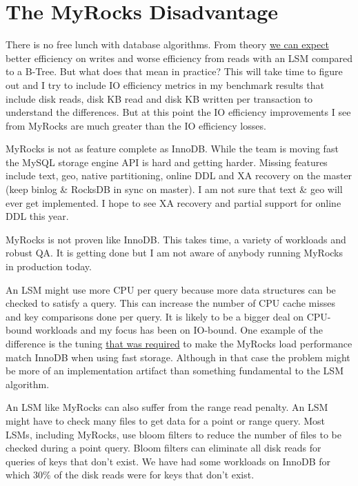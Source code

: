 \documentclass[a4paper,12pt,notitlepage,twoside,openright]{article}
\begin{document}
\hypertarget{the-myrocks-disadvantage}{%
\section{The MyRocks Disadvantage}\label{the-myrocks-disadvantage}}

There is no free lunch with database algorithms. From theory
\href{http://smalldatum.blogspot.com/2015/11/read-write-space-amplification-b-tree.html}{we
can expect} better efficiency on writes and worse efficiency from reads
with an LSM compared to a B-Tree. But what does that mean in practice?
This will take time to figure out and I try to include IO efficiency
metrics in my benchmark results that include disk reads, disk KB read
and disk KB written per transaction to understand the differences. But
at this point the IO efficiency improvements I see from MyRocks are much
greater than the IO efficiency losses.

MyRocks is not as feature complete as InnoDB. While the team is moving
fast the MySQL storage engine API is hard and getting harder. Missing
features include text, geo, native partitioning, online DDL and XA
recovery on the master (keep binlog \& RocksDB in sync on master). I am
not sure that text \& geo will ever get implemented. I hope to see XA
recovery and partial support for online DDL this year.

MyRocks is not proven like InnoDB. This takes time, a variety of
workloads and robust QA. It is getting done but I am not aware of
anybody running MyRocks in production today.

An LSM might use more CPU per query because more data structures can be
checked to satisfy a query. This can increase the number of CPU cache
misses and key comparisons done per query. It is likely to be a bigger
deal on CPU-bound workloads and my focus has been on IO-bound. One
example of the difference is the tuning
\href{http://smalldatum.blogspot.com/2016/01/faster-loads-for-myrocks.html}{that
was required} to make the MyRocks load performance match InnoDB when
using fast storage. Although in that case the problem might be more of
an implementation artifact than something fundamental to the LSM
algorithm.

An LSM like MyRocks can also suffer from the range read penalty. An LSM
might have to check many files to get data for a point or range query.
Most LSMs, including MyRocks, use bloom filters to reduce the number of
files to be checked during a point query. Bloom filters can eliminate
all disk reads for queries of keys that don't exist. We have had some
workloads on InnoDB for which 30\% of the disk reads were for keys that
don't exist.
\end{document}
